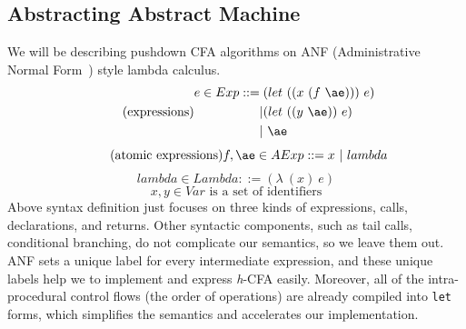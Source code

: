 \documentclass{article}
\begin{document}
\subsection{Abstracting Abstract Machine}
\label{subs:Abstracting Abstract Machine}
We will be describing pushdown CFA algorithms on ANF (Administrative Normal Form~\cite{flanagan1993essence}) style lambda calculus.
\[
\tag{expressions}
\begin{aligned}
\label{eq:bnf}
e \in Exp ::= {}& (let\ ((x\ (f\ \ae)))\ e) {} \\
| & (let\ ((y\ \ae))\ e) {}\\
| & \ \ae
\end{aligned}
\]
\[
\tag{atomic expressions}
f, \ae \in AExp ::= x\ |\ lambda
\]
\[
\tag{lambda abstractions}
lambda \in Lambda ::= (\lambda\ (x)\ e)
\]
\[
\tag{variables}
x,y \in Var \mbox{ is a set of identifiers}
\]
Above syntax definition just focuses on three kinds of expressions, calls, declarations, and returns.
Other syntactic components, such as tail calls, conditional branching, do not complicate our semantics, so we leave them out.
ANF sets a unique label for every intermediate expression, and these unique labels help we to implement and express \textit{h}-CFA easily.
Moreover, all of the intra-procedural control flows (the order of operations) are already compiled into \verb|let| forms, which simplifies the semantics and accelerates our implementation.
\end{document}

